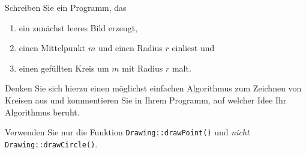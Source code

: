 %
Schreiben Sie ein Programm, das
%
\begin{enumerate}
  \item ein zunächst leeres Bild erzeugt,
  \item einen Mittelpunkt $m$ und einen Radius $r$ einliest und
  \item einen gefüllten Kreis um $m$ mit Radius $r$ malt.
\end{enumerate}
%
Denken Sie sich hierzu einen möglichst einfachen Algorithmus zum
Zeichnen von Kreisen aus und kommentieren Sie in Ihrem Programm, auf
welcher Idee Ihr Algorithmus beruht.

Verwenden Sie nur die Funktion
\texttt{Drawing::drawPoint()} und \emph{nicht}
\texttt{Drawing::drawCircle()}.
